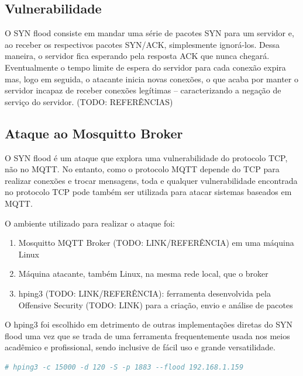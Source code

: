 \subsection{Vulnerabilidade}

O SYN flood consiste em mandar uma série de pacotes SYN para um servidor e, ao receber os respectivos pacotes SYN/ACK, simplesmente ignorá-los. Dessa maneira, o servidor fica esperando pela resposta ACK que nunca chegará. Eventualmente o tempo limite de espera do servidor para cada conexão expira mas, logo em seguida, o atacante inicia novas conexões, o que acaba por manter o servidor incapaz de receber conexões legítimas -- caracterizando a negação de serviço do servidor. (TODO: REFERÊNCIAS)


\subsection{Ataque ao Mosquitto Broker}
O SYN flood é um ataque que explora uma vulnerabilidade do protocolo TCP, não no MQTT. No entanto, como o protocolo MQTT depende do TCP para realizar conexões e trocar mensagens, toda e qualquer vulnerabilidade encontrada no protocolo TCP pode também ser utilizada para atacar sistemas baseados em MQTT.

O ambiente utilizado para realizar o ataque foi:
\begin{enumerate}
    \item Mosquitto MQTT Broker (TODO: LINK/REFERÊNCIA) em uma máquina Linux
    
    \item Máquina atacante, também Linux, na mesma rede local,  que o broker
    
    \item hping3 (TODO: LINK/REFERÊNCIA): ferramenta desenvolvida pela Offensive Security (TODO: LINK) para a criação, envio e análise de pacotes
\end{enumerate}

O hping3 foi escolhido em detrimento de outras implementações diretas do SYN flood uma vez que se trada de uma ferramenta frequentemente usada nos meios acadêmico e profissional, sendo inclusive de fácil uso e grande versatilidade. 




\begin{lstlisting}[language=bash, caption=SYN Flood]
# hping3 -c 15000 -d 120 -S -p 1883 --flood 192.168.1.159
\end{lstlisting}



